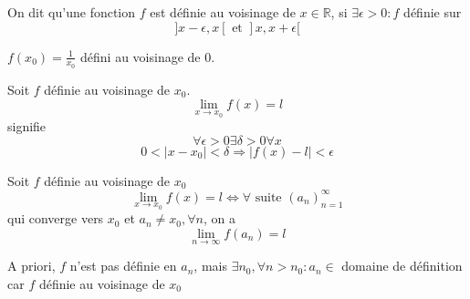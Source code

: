 \documentclass[../main.tex]{subfiles}
\begin{document}
\begin{defn}
	On dit qu'une fonction $f$ est définie au voisinage de $x \in \mathbb{R}$, si
	$\exists \epsilon>0: f$ définie sur
	\[ 
		]x-\epsilon,x[ \text{ et } ]x,x+\epsilon[
	\]
	
\end{defn}
\begin{exemple}
	$f(x_0)=\frac{1}{x_0}$ défini au voisinage de 0.
\end{exemple}
\begin{defn}
Soit $f$ définie au voisinage de $ x_0$.
\[ 
	\lim_{x \to x_0} f(x) =l
\]
signifie
\[ 
\forall \epsilon>0 \exists \delta >0 \forall x
\]
\[ 
	0<|x-x_0| <\delta \Rightarrow |f(x) -l| < \epsilon
\]

\end{defn}
\begin{thm}
Soit $f$ définie au voisinage de $x_0$
\[ 
	\lim_{x \to x_0} f(x) = l \iff \forall \text{ suite } ( a_n)_{n=1} ^{ \infty}
\]
qui converge vers $ x_0$ et $a_n\neq x_0, \forall n$, on  a
\[ 
	\lim_{n \to \infty} f(a_n) =l
\]
\end{thm}
\begin{rmq}
	A priori, $f$ n'est pas définie en $a_n$, mais $\exists n_0, \forall n >n_0: a_n \in$ domaine de définition car $f$ définie au voisinage de $ x_0$
\end{rmq}
\end{document}
